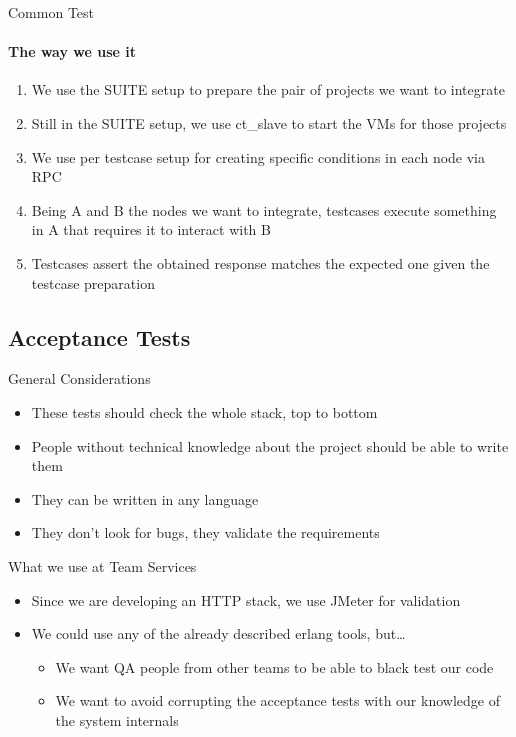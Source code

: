 \documentclass[aspectratio=169]{beamer}
\begin{document}
\begin{frame}{Common Test}
    \framesubtitle {The way we use it}
    \begin{enumerate}
    \pause
    \item We use the SUITE setup to prepare the pair of projects we want to integrate
    \pause
    \item Still in the SUITE setup, we use ct\_slave to start the VMs for those projects
    \pause
    \item We use per testcase setup for creating specific conditions in each node via RPC
    \pause
    \item Being A and B the nodes we want to integrate, testcases execute something in A that requires it to interact
    with B
    \pause
    \item Testcases assert the obtained response matches the expected one given the testcase preparation
    \end{enumerate}
\end{frame}

\subsection*{Acceptance Tests}
\label{acceptance_tests}

\begin{frame}{General Considerations}
    \begin{itemize}
    \pause
    \item These tests should check the whole stack, top to bottom
    \pause
    \item People without technical knowledge about the project should be able to write them
    \pause
    \item They can be written in any language
    \pause
    \item They don't look for bugs, they validate the requirements
    \end{itemize}
\end{frame}

\begin{frame}{What we use at Team Services}
    \begin{itemize}
    \item Since we are developing an HTTP stack, we use JMeter for validation
    \item We could use any of the already described erlang tools, but\dots
        \begin{itemize}
        \pause
        \item We want QA people from other teams to be able to black test our code
        \pause
        \item We want to avoid corrupting the acceptance tests with our knowledge of the system internals
        \end{itemize}
    \end{itemize}
\end{frame}
\end{document}
